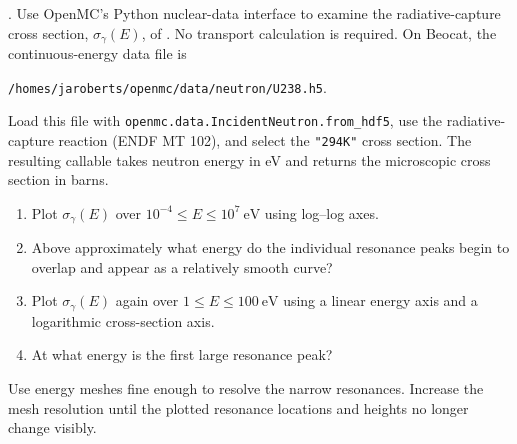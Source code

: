 
. Use OpenMC's Python nuclear-data interface to
examine the radiative-capture cross section, $\sigma_\gamma(E)$, of
. No transport calculation is required. On Beocat, the
continuous-energy data file is
\begin{center}
\texttt{/homes/jaroberts/openmc/data/neutron/U238.h5}.
\end{center}
Load this file with \texttt{openmc.data.IncidentNeutron.from\_hdf5}, use the
radiative-capture reaction (ENDF MT 102), and select the \texttt{"294K"}
cross section. The resulting callable takes neutron energy in eV and returns
the microscopic cross section in barns.

\begin{enumerate}[label=(\alph*)]
\item Plot $\sigma_\gamma(E)$ over $10^{-4}\leq E\leq10^7~\mathrm{eV}$
using log--log axes.
\item Above approximately what energy do the individual resonance peaks begin
to overlap and appear as a relatively smooth curve?
\item Plot $\sigma_\gamma(E)$ again over $1\leq E\leq100~\mathrm{eV}$ using
a linear energy axis and a logarithmic cross-section axis.
\item At what energy is the first large resonance peak?
\end{enumerate}
Use energy meshes fine enough to resolve the narrow resonances. Increase the
mesh resolution until the plotted resonance locations and heights no longer
change visibly.

